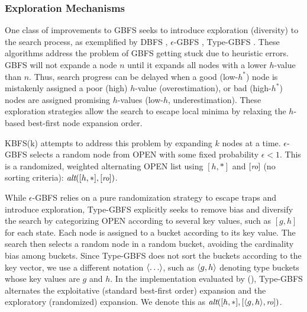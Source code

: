 \subsubsection{Exploration Mechanisms}

One class of improvements to GBFS seeks to introduce exploration (diversity) to the search process, as exemplified by DBFS \cite{imai2011novel}, $\epsilon$-GBFS \cite{valenzano2014comparison}, Type-GBFS
\cite{xie14type}.
These algorithms address the problem of GBFS getting stuck due to heuristic errors.
GBFS will not expande a node $n$  until it expands all nodes with a lower $h$-value than $n$.
Thus, search progress can be delayed when a good (low-$h^*$) node is mistakenly assigned a poor (high) $h$-value (overestimation), or bad (high-$h^*$) nodes are assigned promising $h$-values (low-$h$, underestimation).
These exploration strategies allow the search to escape local minima by relaxing the $h$-based best-first node expansion order.

KBFS(k) \cite{felner2003kbfs} attempts to address this problem by expanding $k$ nodes at a time.
% 
% 
$\epsilon$-GBFS \cite{valenzano2014comparison} selects a random node from OPEN with some fixed probability $\epsilon <1$.
This is a randomized, weighted alternating 
OPEN list using $[h,*]$ and $[{\small\textit{ro}}]$ (no sorting criteria): $\textit{alt}([h,*],[{\small\textit{ro}}])$.

While $\epsilon$-GBFS relies on  a pure randomization strategy to escape traps and introduce exploration, 
Type-GBFS \cite{xie14type} explicitly seeks to remove bias and diversify the search  by categorizing OPEN according to several key values, such as $[g,h]$ for each state.
Each node is assigned to a bucket according to its key value.
The search then selects a random node in a random
bucket, avoiding the cardinality bias among buckets.
Since Type-GBFS does not sort the buckets according to the key vector, we use a different notation ${\left<\ldots\right>}$,
such as ${\left<g,h\right>}$ denoting type buckets whose key values are $g$ and $h$.
In the implementation evaluated by \citeauthor{xie14type} (\citeyear{xie14type}),
Type-GBFS alternates the exploitative (standard best-first order) expansion and the exploratory (randomized) expansion. We denote this 
 as $\textit{alt}([h,*], [{\left<g,h\right>},{\small\textit{ro}}])$.

